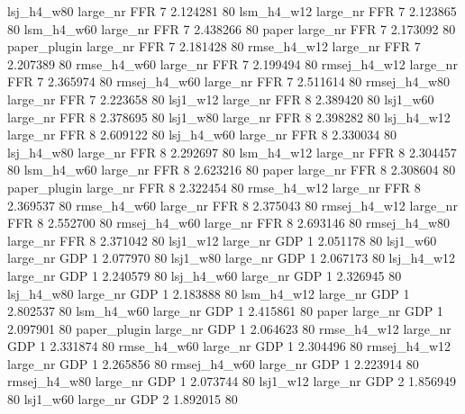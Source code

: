   lsj_h4_w80   large_nr      FFR                 7 2.124281 80
  lsm_h4_w12   large_nr      FFR                 7 2.123865 80
  lsm_h4_w60   large_nr      FFR                 7 2.438266 80
       paper   large_nr      FFR                 7 2.173092 80
paper_plugin   large_nr      FFR                 7 2.181428 80
 rmse_h4_w12   large_nr      FFR                 7 2.207389 80
 rmse_h4_w60   large_nr      FFR                 7 2.199494 80
rmsej_h4_w12   large_nr      FFR                 7 2.365974 80
rmsej_h4_w60   large_nr      FFR                 7 2.511614 80
rmsej_h4_w80   large_nr      FFR                 7 2.223658 80
    lsj1_w12   large_nr      FFR                 8 2.389420 80
    lsj1_w60   large_nr      FFR                 8 2.378695 80
    lsj1_w80   large_nr      FFR                 8 2.398282 80
  lsj_h4_w12   large_nr      FFR                 8 2.609122 80
  lsj_h4_w60   large_nr      FFR                 8 2.330034 80
  lsj_h4_w80   large_nr      FFR                 8 2.292697 80
  lsm_h4_w12   large_nr      FFR                 8 2.304457 80
  lsm_h4_w60   large_nr      FFR                 8 2.623216 80
       paper   large_nr      FFR                 8 2.308604 80
paper_plugin   large_nr      FFR                 8 2.322454 80
 rmse_h4_w12   large_nr      FFR                 8 2.369537 80
 rmse_h4_w60   large_nr      FFR                 8 2.375043 80
rmsej_h4_w12   large_nr      FFR                 8 2.552700 80
rmsej_h4_w60   large_nr      FFR                 8 2.693146 80
rmsej_h4_w80   large_nr      FFR                 8 2.371042 80
    lsj1_w12   large_nr      GDP                 1 2.051178 80
    lsj1_w60   large_nr      GDP                 1 2.077970 80
    lsj1_w80   large_nr      GDP                 1 2.067173 80
  lsj_h4_w12   large_nr      GDP                 1 2.240579 80
  lsj_h4_w60   large_nr      GDP                 1 2.326945 80
  lsj_h4_w80   large_nr      GDP                 1 2.183888 80
  lsm_h4_w12   large_nr      GDP                 1 2.802537 80
  lsm_h4_w60   large_nr      GDP                 1 2.415861 80
       paper   large_nr      GDP                 1 2.097901 80
paper_plugin   large_nr      GDP                 1 2.064623 80
 rmse_h4_w12   large_nr      GDP                 1 2.331874 80
 rmse_h4_w60   large_nr      GDP                 1 2.304496 80
rmsej_h4_w12   large_nr      GDP                 1 2.265856 80
rmsej_h4_w60   large_nr      GDP                 1 2.223914 80
rmsej_h4_w80   large_nr      GDP                 1 2.073744 80
    lsj1_w12   large_nr      GDP                 2 1.856949 80
    lsj1_w60   large_nr      GDP                 2 1.892015 80
